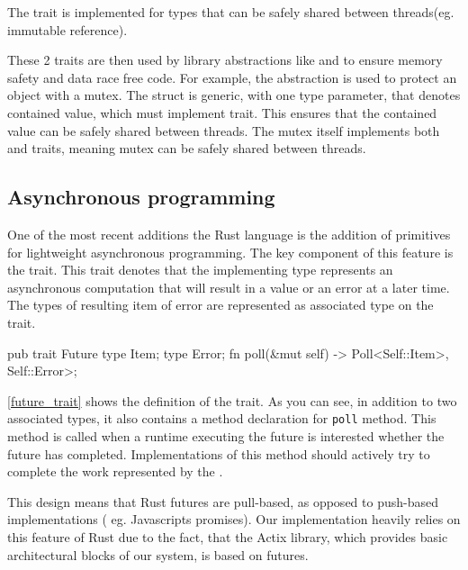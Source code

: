 The  trait is implemented for types that can be safely shared between threads(eg. immutable reference).

These 2 traits are then used by library abstractions like  and  to ensure memory safety and data race free code.
For example, the  abstraction is used to protect an object with a mutex. The  struct is generic,
with one type parameter, that denotes contained value, which must implement  trait.
This ensures that the contained value can be safely shared between threads. The mutex itself implements both  and  traits,
meaning mutex can be safely shared between threads.

\subsection{Asynchronous programming}
One of the most recent additions the Rust language is the addition of primitives for lightweight asynchronous programming.
The key component of this feature is the  trait. This trait denotes that the implementing type represents
an asynchronous computation that will result in a value or an error at a later time. The types of resulting item of error
are represented as associated type on the  trait.

\begin{code}[language=rust,label={future_trait},caption={Future trait}]

pub trait Future {
    type Item;
    type Error;
    fn poll(&mut self) -> Poll<Self::Item>, Self::Error>;
}
\end{code}

\autoref{future_trait} shows the definition of the  trait. As you can see, in addition to two associated types,
it also contains a method declaration for \verb|poll| method. This method is called when a runtime executing the future
is interested whether the future has completed. Implementations of this method should actively try to complete
the work represented by the .

This design means that Rust futures are pull-based, as opposed to push-based implementations ( eg. Javascripts promises).
Our implementation heavily relies on this feature of Rust due to the fact, that the Actix library, which provides
basic architectural blocks of our system, is based on futures.

